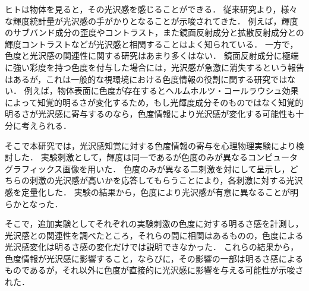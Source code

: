 ヒトは物体を見ると，その光沢感を感じることができる．
従来研究より，様々な輝度統計量が光沢感の手がかりとなることが示唆されてきた．
例えば，輝度のサブバンド成分の歪度やコントラスト，また鏡面反射成分と拡散反射成分との輝度コントラストなどが光沢感と相関することはよく知られている．
一方で，色度と光沢感の関連性に関する研究はあまり多くはない．
鏡面反射成分に極端に強い彩度を持つ色度を付与した場合には，光沢感が急激に消失するという報告はあるが，これは一般的な視環境における色度情報の役割に関する研究ではない．
例えば，物体表面に色度が存在するとヘルムホルツ・コールラウシュ効果によって知覚的明るさが変化するため，もし光輝度成分そのものではなく知覚的明るさが光沢感に寄与するのなら，色度情報により光沢感が変化する可能性も十分に考えられる．

そこで本研究では，光沢感知覚に対する色度情報の寄与を心理物理実験により検討した．
実験刺激として，輝度は同一であるが色度のみが異なるコンピュータグラフィックス画像を用いた．
色度のみが異なる二刺激を対にして呈示し，どちらの刺激の光沢感が高いかを応答してもらうことにより，各刺激に対する光沢感を定量化した．
実験の結果から，色度により光沢感が有意に異なることが明らかとなった．

そこで，追加実験としてそれぞれの実験刺激の色度に対する明るさ感を計測し，光沢感との関連性を調べたところ，それらの間に相関はあるものの，色度による光沢感変化は明るさ感の変化だけでは説明できなかった．
これらの結果から，色度情報が光沢感に影響すること，ならびに，その影響の一部は明るさ感によるものであるが，それ以外に色度が直接的に光沢感に影響を与える可能性が示唆された．